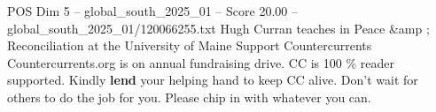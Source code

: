 \begin{textsample}{POS Dim 5 – global\_south\_2025\_01 – Score 20.00 – global\_south\_2025\_01/120066255.txt}
Hugh Curran teaches in Peace \&amp ; Reconciliation at the University of Maine Support Countercurrents Countercurrents.org is on annual fundraising drive.
CC is 100 \% reader supported.
Kindly \textbf{lend} your helping hand to keep CC alive.
Don't wait for others to do the job for you.
Please chip in with whatever you can.

\end{textsample}
